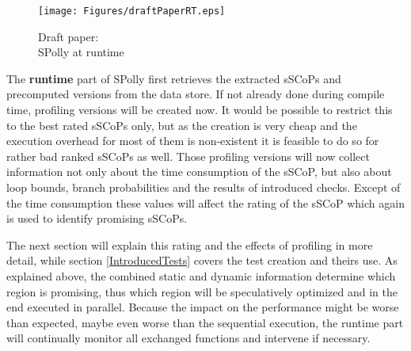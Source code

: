 \begin{figure}
  \centering
  \texttt{[image: Figures/draftPaperRT.eps]}
  \caption{Draft paper: \\ SPolly at runtime}
  \vspace*{-5mm}
  \label{fig:draftPaperCT}  
\end{figure}
The \textbf{runtime} part of SPolly first retrieves the extracted sSCoPs and 
precomputed versions from the data store. If not already done during  compile
time, profiling versions will be created now. It would be possible to restrict
this to the best rated sSCoPs only, but as the creation is very cheap and the execution 
overhead for most of them is non-existent it is feasible to do so for rather bad
ranked sSCoPs as well. Those profiling versions will now collect information
not only about the time consumption of the sSCoP, but also about loop bounds,
branch probabilities and the results of introduced checks. Except of the time
consumption these values will affect the rating of the sSCoP which again is used
to identify promising sSCoPs.

The next section will explain this rating and the effects of profiling in more 
detail, while section \ref{IntroducedTests} covers the test creation and theirs use. 
As explained above, the combined static and dynamic information determine which region
is promising, thus which region will be speculatively optimized and in the end
executed in parallel. Because the impact on the performance might be worse than
expected, maybe even worse than the sequential execution, the runtime part will
continually monitor all exchanged functions and intervene if necessary.





